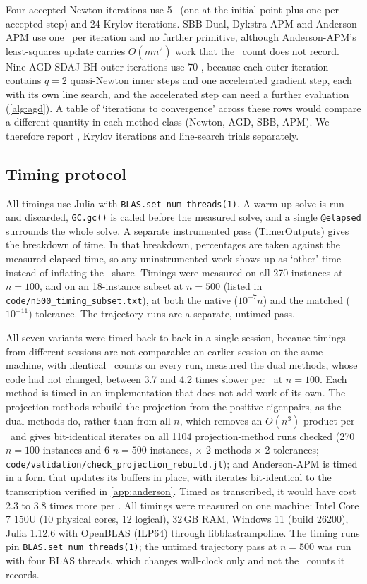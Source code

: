 Four accepted Newton iterations use 5 \EVDs\ (one at the initial point plus one
per accepted step) and 24 Krylov iterations. SBB-Dual,
Dykstra-APM and Anderson-APM use one \EVD\ per iteration and no further
primitive, although Anderson-APM's least-squares update carries $O(mn^2)$ work
that the \EVD\ count does not record. Nine AGD-SDAJ-BH outer
iterations use 70 \EVDs, because each outer iteration contains $q=2$
quasi-Newton inner steps and one accelerated gradient step, each with its own
line search, and the accelerated step can need a further evaluation
(\cref{alg:agd}). A table of
`iterations to convergence' across these rows would compare a different
quantity in each method class (Newton, AGD, SBB, APM). We therefore report \EVDs, Krylov iterations and
line-search trials separately.

\subsection{Timing protocol}\label{sec:timing}
All timings use Julia with \texttt{BLAS.set\_num\_threads(1)}. A warm-up solve
is run and discarded, \texttt{GC.gc()} is called before the measured solve,
and a single \texttt{@elapsed} surrounds the whole solve. A separate
instrumented pass (TimerOutputs) gives the breakdown of time. In that
breakdown, percentages are taken against the measured elapsed time, so any
uninstrumented work shows up as `other' time instead of inflating the
\EVD\ share. Timings were measured on all 270 instances at $n=100$, and on an
18-instance subset at $n=500$ (listed in \texttt{code/n500\_timing\_subset.txt}),
at both the native ($10^{-7}n$) and the matched ($10^{-11}$) tolerance. The
trajectory runs are a separate, untimed pass.

All seven variants were timed back to back in a single session, because
timings from different sessions are not comparable: an earlier session on the
same machine, with identical \EVD\ counts on every run, measured the dual
methods, whose code had not changed, between 3.7 and 4.2 times slower per
\EVD\ at $n=100$. Each
method is timed in an implementation that does not add work of its own. The
projection methods rebuild the projection from the positive eigenpairs, as the
dual methods do, rather than from all $n$, which removes an $O(n^3)$ product
per \EVD\ and gives bit-identical iterates on all 1104 projection-method runs
checked (270 $n=100$ instances and 6 $n=500$ instances, $\times$ 2 methods
$\times$ 2 tolerances; \texttt{code/validation/check\_projection\_rebuild.jl}); and
Anderson-APM is timed in a form that updates its buffers in place, with
iterates bit-identical to the transcription verified in \cref{app:anderson}.
Timed as transcribed, it would have cost $2.3$ to $3.8$ times more per \EVD.
All timings were measured on one machine: Intel Core 7 150U (10 physical
cores, 12 logical), 32\,GB RAM, Windows 11 (build 26200), Julia 1.12.6 with
OpenBLAS (ILP64) through libblastrampoline. The timing runs pin
\texttt{BLAS.set\_num\_threads(1)}; the untimed trajectory pass at $n=500$ was
run with four BLAS threads, which changes wall-clock only and not the \EVD\
counts it records.

